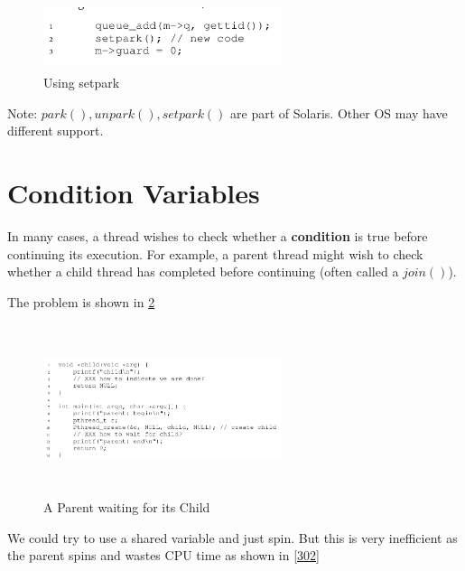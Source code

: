 \begin{figure}[h!]
    \label{setpark}
    \begin{center}
        \includegraphics[width=7cm, height=2cm]{img/setpark.png}
        \caption{Using setpark}
    \end{center}
\end{figure}

Note: $park(), unpark(), setpark()$ are part of Solaris. Other OS may have 
different support.

\section{Condition Variables}

In many cases, a thread wishes to check whether a \textbf{condition} is true
before continuing its execution. For example, a parent thread might wish
to check whether a child thread has completed before continuing (often called a
$join()$).

The problem is shown in \ref{301}

\begin{figure}[h!]
    \label{301}
    \begin{center}
        \includegraphics[width=7cm, height=5cm]{img/301.png}
        \caption{A Parent waiting for its Child}
    \end{center}
\end{figure}

We could try to use a shared variable and just spin. But this is very inefficient
as the parent spins and wastes CPU time as shown in \ref{302}

